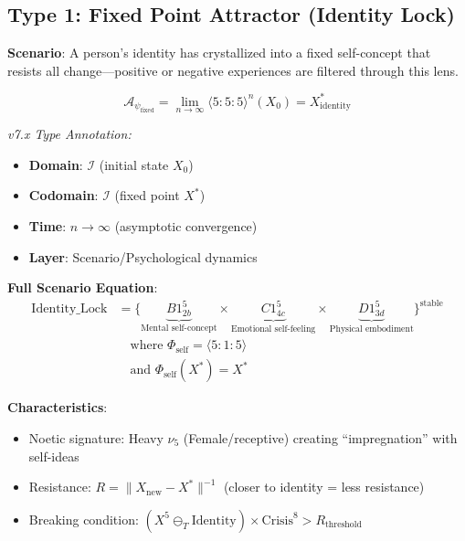\documentclass[11pt,twoside]{book}
\newcommand{\noe}[1]{\nu_{#1}}
\newcommand{\Ideas}{\mathcal{I}}
\newcommand{\Frac}{\Phi}
\newcommand{\Tsub}{\ominus_T}
\newcommand{\PsychAttractor}{\mathcal{A}_\psi}
\begin{document}
\subsection{Type 1: Fixed Point Attractor (Identity Lock)}

\textbf{Scenario}: A person's identity has crystallized into a fixed self-concept that
resists all change---positive or negative experiences are filtered through this lens.

\begin{equation}
\boxed{
    \PsychAttractor_{\mathrm{fixed}} = \lim_{n \to \infty} \langle 5 : 5 : 5 \rangle^n (X_0)
    = X^*_{\mathrm{identity}}
}
\end{equation}

\textit{v7.x Type Annotation:}
\begin{itemize}
    \item \textbf{Domain}: $\Ideas$ (initial state $X_0$)
    \item \textbf{Codomain}: $\Ideas$ (fixed point $X^*$)
    \item \textbf{Time}: $n \to \infty$ (asymptotic convergence)
    \item \textbf{Layer}: Scenario/Psychological dynamics
\end{itemize}

\textbf{Full Scenario Equation}:
\begin{align}
    \text{Identity\_Lock} &= \biggl\{
    \underbrace{B1^5_{2b}}_{\text{Mental self-concept}} \times
    \underbrace{C1^5_{4c}}_{\text{Emotional self-feeling}} \times
    \underbrace{D1^5_{3d}}_{\text{Physical embodiment}}
    \biggr\}^{\mathrm{stable}} \nonumber \\
    &\quad \text{where } \Frac_{\mathrm{self}} = \langle 5 : 1 : 5 \rangle \\
    &\quad \text{and } \Frac_{\mathrm{self}}(X^*) = X^*
\end{align}

\textbf{Characteristics}:
\begin{itemize}
    \item Noetic signature: Heavy $\noe{5}$ (Female/receptive) creating ``impregnation'' with self-ideas
    \item Resistance: $R = \|X_{\mathrm{new}} - X^*\|^{-1}$ (closer to identity = less resistance)
    \item Breaking condition: $(X^5 \Tsub \mathrm{Identity}) \times \mathrm{Crisis}^8 > R_{\mathrm{threshold}}$
\end{itemize}
\end{document}
